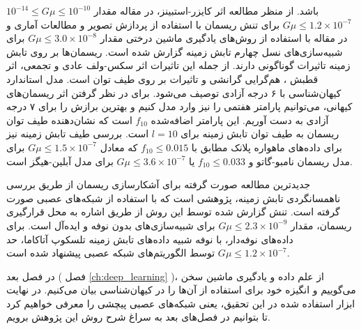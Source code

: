  $10^{-14} \leq G\mu \leq 10^{-10}$ 
 باشد. 
 \cite{ringeval2017stochastic}
از منظر مطالعه اثر کایزر-استبینز، در مقاله 
\cite{vafaei2017multiscale}
مقدار  
$G\mu \leq 1.2 \times 10^{-7}$
برای تنش ریسمان با استفاده از پردازش تصویر و مطالعات آماری و در مقاله 
\cite{vafaei2018cosmic}
با استفاده از روش‌های یادگیری ماشین درختی مقدار 
$G\mu \leq 3.0 \times 10^{-8}$
برای شبیه‌سازی‌های نسل چهارم تابش زمینه گزارش شده است. 
ریسمان‌ها بر روی تابش زمینه تاثیرات گوناگونی دارند. از جمله این تاثیرات اثر سکس-ولف عادی و تجمعی، اثر قطبش
\cite{baumann1980method}
، هم‌گرایی گرانشی و تاثیرات بر روی طیف توان است. مدل استاندارد کیهان‌شناسی با ۶ درجه آزادی توصیف می‌شود. برای در نظر گرفتن اثر ریسمان‌های کیهانی، می‌توانیم پارامتر هفتمی را نیز وارد مدل کنیم و بهترین برازش را برای ۷ درجه آزادی به دست آوریم. این پارامتر اضافه‌شده     
$f_{10}$
است که نشان‌دهنده طیف توان ریسمان به طیف توان تابش زمینه برای 
$l = 10$
است. بررسی طیف تابش زمینه نیز برای داده‌های ماهواره پلانک مطابق با 
$f_{10} \leq 0.015 $
که معادل 
$G\mu \leq 1.5 \times 10^{-7}$
برای مدل ریسمان نامبو-گاتو و 
$f_{10} \leq 0.033 $
یا 
$G\mu \leq 3.6 \times 10^{-7}$
برای مدل آبلین-هیگز است. 
 
\cite{ade2014planck}
جدیدترین مطالعه صورت گرفته برای آشکارسازی ریسمان از طریق بررسی ناهمسانگردی تابش زمینه، پژوهشی است که با استفاده از شبکه‌های عصبی صورت گرفته است. تنش گزارش شده توسط این روش از طریق اشاره به محل قرارگیری ریسمان، مقدار 
$G\mu \leq 2.3 \times 10^{-9}$
برای شبیه‌سازی‌های بدون نوفه و ایده‌آل است. 
\cite{ciuca2017bayesian, ciuca2019inferring}
برای داده‌های نوفه‌دار، با نوفه شبیه داده‌های تابش زمینه تلسکوپ آتاکاما، حد 
$G\mu \leq 1.2 \times 10^{-7}$
توسط الگوریتم‌های شبکه عصبی پیشنهاد شده است.
\cite{ciuca2020information}

\par
در فصل بعد ( فصل
\ref{ch:deep_learning}
)، از علم داده و یادگیری ماشین سخن می‌گوییم و انگیزه خود برای استفاده از آن‌‌ها را در کیهان‌شناسی بیان می‌کنیم. در نهایت‌ ابزار استفاده شده در این تحقیق، یعنی شبکه‌های عصبی پیچشی را معرفی خواهیم کرد تا بتوانیم در فصل‌های بعد به سراغ شرح روش این پژوهش برویم. 



  